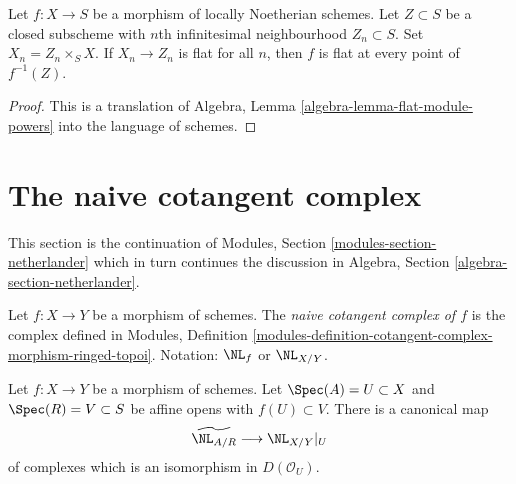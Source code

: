 \begin{lemma}
\label{lemma-check-flatness-on-infinitesimal-nbhds}
Let $f : X \to S$ be a morphism of locally Noetherian schemes.
Let $Z \subset S$ be a closed subscheme with $n$th infinitesimal
neighbourhood $Z_n \subset S$. Set $X_n = Z_n \times_S X$.
If $X_n \to Z_n$ is flat for all $n$, then $f$
is flat at every point of $f^{-1}(Z)$.
\end{lemma}

\begin{proof}
This is a translation of Algebra, Lemma \ref{algebra-lemma-flat-module-powers}
into the language of schemes.
\end{proof}








\section{The naive cotangent complex}
\label{section-netherlander}

\noindent
This section is the continuation of
Modules, Section \ref{modules-section-netherlander}
which in turn continues the discussion in
Algebra, Section \ref{algebra-section-netherlander}.

\begin{definition}
\label{definition-netherlander}
Let $f : X \to Y$ be a morphism of schemes.
The {\it naive cotangent complex of $f$}
is the complex defined in Modules, Definition
\ref{modules-definition-cotangent-complex-morphism-ringed-topoi}.
Notation: $\NL_f$ or $\NL_{X/Y}$.
\end{definition}

\begin{lemma}
\label{lemma-NL-affine}
Let $f : X \to Y$ be a morphism of schemes. Let
$\Spec(A) = U \subset X$ and $\Spec(R) = V \subset S$
be affine opens with $f(U) \subset V$.
There is a canonical map
$$
\widetilde{\NL_{A/R}} \longrightarrow \NL_{X/Y}|_U
$$
of complexes which is an isomorphism in $D(\mathcal{O}_U)$.
\end{lemma}

